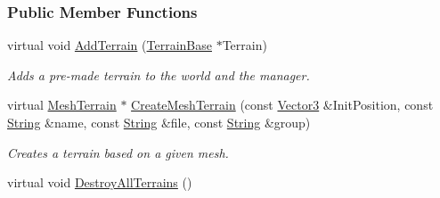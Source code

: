 \subsubsection*{Public Member Functions}
\begin{DoxyCompactItemize}
\item 
virtual void \hyperlink{classMezzanine_1_1TerrainManager_ace206114313eb7dcd96706a10195dea6}{AddTerrain} (\hyperlink{classMezzanine_1_1TerrainBase}{TerrainBase} $\ast$Terrain)
\begin{DoxyCompactList}\small\item\em Adds a pre-\/made terrain to the world and the manager. \item\end{DoxyCompactList}\item 
virtual \hyperlink{classMezzanine_1_1MeshTerrain}{MeshTerrain} $\ast$ \hyperlink{classMezzanine_1_1TerrainManager_acb65dd655f4e42ac530442ffb35f12e0}{CreateMeshTerrain} (const \hyperlink{classMezzanine_1_1Vector3}{Vector3} \&InitPosition, const \hyperlink{namespaceMezzanine_acf9fcc130e6ebf08e3d8491aebcf1c86}{String} \&name, const \hyperlink{namespaceMezzanine_acf9fcc130e6ebf08e3d8491aebcf1c86}{String} \&file, const \hyperlink{namespaceMezzanine_acf9fcc130e6ebf08e3d8491aebcf1c86}{String} \&group)
\begin{DoxyCompactList}\small\item\em Creates a terrain based on a given mesh. \item\end{DoxyCompactList}\item 
\hypertarget{classMezzanine_1_1TerrainManager_a8e97f7a8f58e782ff43f18c53901fb50}{
virtual void \hyperlink{classMezzanine_1_1TerrainManager_a8e97f7a8f58e782ff43f18c53901fb50}{DestroyAllTerrains} ()}
\label{classMezzanine_1_1TerrainManager_a8e97f7a8f58e782ff43f18c53901fb50}


\end{DoxyCompactItemize}

